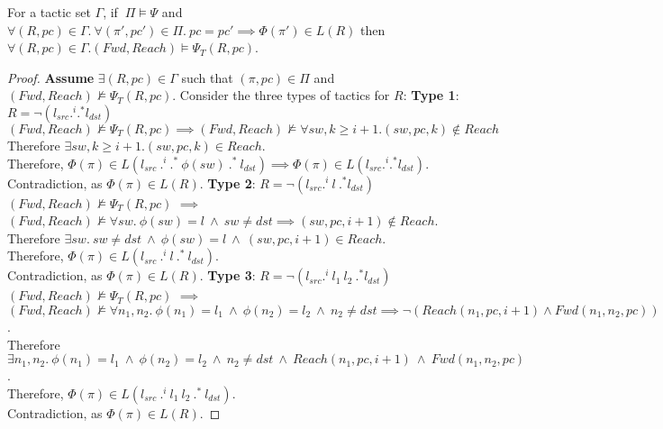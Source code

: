 \begin{theorem}[Completeness]
For a tactic set $\Gamma$, if $~\Pi \models \Psi$ and 
$\forall (R, pc) \in \Gamma. ~\forall(\pi', pc') \in \Pi. ~pc = pc' \implies \Phi(\pi') \in L(R)$
then $\forall (R, pc) \in \Gamma. (Fwd, Reach) \models \Psi_T(R, pc)$.
\end{theorem}
\begin{proof}
	\textbf{Assume} $\exists (R, pc) \in \Gamma$ such that $(\pi, pc) \in \Pi$ and  
	$(Fwd, Reach) \not\models \Psi_T(R,pc)$.
	Consider the three types of tactics for $R$: \newline
	\textbf{Type 1}: $R = \neg (l_{src} .^i .^* l_{dst})$ \newline
	$(Fwd, Reach) \not\models \Psi_T(R, pc) \implies (Fwd, Reach) \not\models \forall sw,k \geq i + 1. (sw,pc,k) \notin Reach$ \newline
	Therefore $\exists sw, k \geq i + 1. (sw,pc,k) \in Reach$. \\
	Therefore, $\Phi(\pi) \in L(l_{src}\ .^i \ .^* \ \phi(sw) \ .^* \ l_{dst}) \implies \Phi(\pi) \in L(l_{src} .^i .^* l_{dst}).$\\
	Contradiction, as $\Phi(\pi) \in L(R)$.
	\newline 
	\newline 
	\textbf{Type 2}: $R = \neg (l_{src} .^i \ l \ .^* l_{dst})$ \newline
	$(Fwd, Reach) \not\models \Psi_T(R, pc)$ $\implies$ $(Fwd, Reach) \not\models \forall sw.~ \phi(sw) = l ~\wedge~ sw \not= dst \implies  (sw, pc, i + 1) \notin Reach$. \\
	Therefore $\exists sw. \ sw \not= dst \ \wedge \ \phi(sw) = l \ \wedge \ (sw,pc,i+1) \in Reach$. \\
	Therefore, $\Phi(\pi) \in L( l_{src}\ .^i \ l \ .^* \ l_{dst})$. \\
	Contradiction, as $\Phi(\pi) \in L(R)$. 
	\newline  
	\newline
	\textbf{Type 3}: $R = \neg (l_{src} .^i \ l_1 \ l_2 \ .^* l_{dst})$ \newline
	$(Fwd, Reach) \not\models \Psi_T(R, pc)$ $\implies$ $(Fwd, Reach) \not\models \forall n_1, n_2.~\phi(n_1) = l_1~\wedge~ \phi(n_2) = l_2 ~\wedge~ n_2 \not=dst  \implies 
	\neg (Reach(n_1, pc, i + 1) \wedge Fwd(n_1, n_2, pc))$. \\
	Therefore $\exists n_1, n_2. ~\phi(n_1) = l_1~\wedge~ \phi(n_2) = l_2 ~\wedge~ n_2 \not=dst ~\wedge~ Reach(n_1, pc, i + 1) ~\wedge~ Fwd(n_1, n_2, pc)$. \\
	Therefore, $\Phi(\pi) \in L(l_{src}\ .^i \ l_1~l_2 \ .^* \ l_{dst})$. \\
	Contradiction, as $\Phi(\pi) \in L(R)$.
\end{proof}